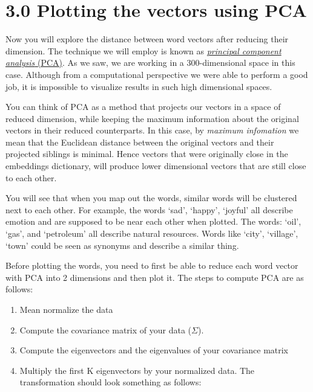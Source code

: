 \documentclass[11pt]{article}
\providecommand{\tightlist}{%
      \setlength{\itemsep}{0pt}\setlength{\parskip}{0pt}}
\begin{document}
    \hypertarget{plotting-the-vectors-using-pca}{%
\section{3.0 Plotting the vectors using
PCA}\label{plotting-the-vectors-using-pca}}

Now you will explore the distance between word vectors after reducing
their dimension. The technique we will employ is known as
\href{https://en.wikipedia.org/wiki/Principal_component_analysis}{\emph{principal
component analysis} (PCA)}. As we saw, we are working in a
300-dimensional space in this case. Although from a computational
perspective we were able to perform a good job, it is impossible to
visualize results in such high dimensional spaces.

You can think of PCA as a method that projects our vectors in a space of
reduced dimension, while keeping the maximum information about the
original vectors in their reduced counterparts. In this case, by
\emph{maximum infomation} we mean that the Euclidean distance between
the original vectors and their projected siblings is minimal. Hence
vectors that were originally close in the embeddings dictionary, will
produce lower dimensional vectors that are still close to each other.

You will see that when you map out the words, similar words will be
clustered next to each other. For example, the words `sad', `happy',
`joyful' all describe emotion and are supposed to be near each other
when plotted. The words: `oil', `gas', and `petroleum' all describe
natural resources. Words like `city', `village', `town' could be seen as
synonyms and describe a similar thing.

Before plotting the words, you need to first be able to reduce each word
vector with PCA into 2 dimensions and then plot it. The steps to compute
PCA are as follows:

\begin{enumerate}
\def\labelenumi{\arabic{enumi}.}
\tightlist
\item
  Mean normalize the data
\item
  Compute the covariance matrix of your data (\(\Sigma\)).
\item
  Compute the eigenvectors and the eigenvalues of your covariance matrix
\item
  Multiply the first K eigenvectors by your normalized data. The
  transformation should look something as follows:
\end{enumerate}
\end{document}
